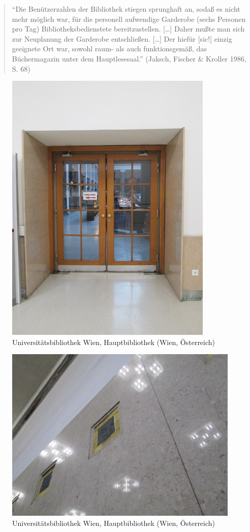 \documentclass[a4paper,
fontsize=11pt,
oneside,
numbers=noperiodatend,
parskip=half-,
bibliography=totoc,
final
]{scrartcl}
\begin{document}
\begin{quote}
\enquote{Die Benützerzahlen der Bibliothek stiegen sprunghaft an, sodaß
es nicht mehr mög\-lich war, für die personell aufwendige Garderobe (sechs
Personen pro Tag) Bibliotheksbedienstete bereitzustellen. {[}\ldots{}{]}
Daher mußte man sich zur Neuplanung der Garderobe entschließen.
{[}\ldots{}{]} Der hiefür {[}sic!{]} einzig geeignete Ort war, sowohl
raum- als auch funktionsgemäß, das Büchermagazin unter dem
Hauptlesesaal.} (Jaksch, Fischer \& Kroller 1986, S. 68)
\end{quote}

\begin{figure}[htbp]
\centering
\includegraphics{./img/038.jpg}
\caption{Universitätsbibliothek Wien, Hauptbibliothek (Wien,
Österreich)}
\end{figure}

\begin{figure}[htbp]
\centering
\includegraphics{./img/039.jpg}
\caption{Universitätsbibliothek Wien, Hauptbibliothek (Wien,
Österreich)}
\end{figure}
\end{document}

